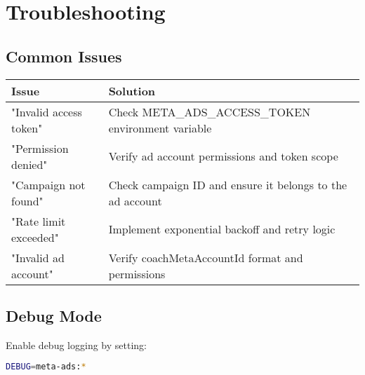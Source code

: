 \documentclass[11pt,a4paper]{article}
\begin{document}
\section{Troubleshooting}
\subsection{Common Issues}
\begin{longtable}{L{4cm}L{8cm}}
\toprule
\textbf{Issue} & \textbf{Solution} \\
\midrule
"Invalid access token" & Check META\_ADS\_ACCESS\_TOKEN environment variable \\
"Permission denied" & Verify ad account permissions and token scope \\
"Campaign not found" & Check campaign ID and ensure it belongs to the ad account \\
"Rate limit exceeded" & Implement exponential backoff and retry logic \\
"Invalid ad account" & Verify coachMetaAccountId format and permissions \\
\bottomrule
\end{longtable}

\subsection{Debug Mode}
Enable debug logging by setting:
\begin{lstlisting}[language=bash]
DEBUG=meta-ads:*
\end{lstlisting}

\end{document}
